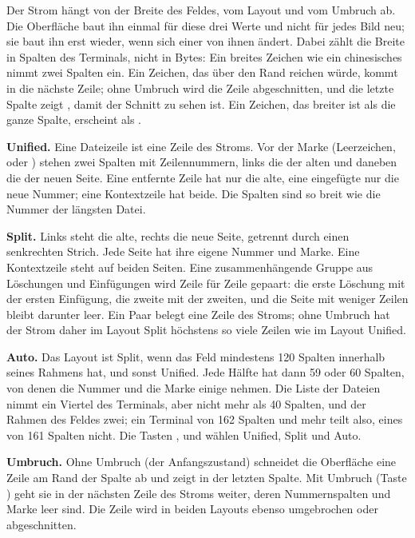 Der Strom hängt von der Breite des Feldes, vom Layout und vom Umbruch ab. Die Oberfläche baut
ihn einmal für diese drei Werte und nicht für jedes Bild neu; sie baut ihn erst wieder, wenn sich
einer von ihnen ändert. Dabei zählt die Breite in Spalten des Terminals, nicht in Bytes: Ein
breites Zeichen wie ein chinesisches nimmt zwei Spalten ein. Ein Zeichen, das über den Rand
reichen würde, kommt in die nächste Zeile; ohne Umbruch wird die Zeile abgeschnitten, und die
letzte Spalte zeigt , damit der Schnitt zu sehen ist. Ein Zeichen, das breiter ist als
die ganze Spalte, erscheint als .

\startitemize[n]
\item {\bf Unified.} Eine Dateizeile ist eine Zeile des Stroms. Vor der Marke (Leerzeichen,
\type{-} oder \type{+}) stehen zwei Spalten mit Zeilennummern, links die der alten und
daneben die der neuen Seite. Eine entfernte Zeile hat nur die alte, eine eingefügte nur die
neue Nummer; eine Kontextzeile hat beide. Die Spalten sind so breit wie die Nummer der
längsten Datei.
\item {\bf Split.} Links steht die alte, rechts die neue Seite, getrennt durch einen senkrechten
Strich. Jede Seite hat ihre eigene Nummer und Marke. Eine Kontextzeile steht auf beiden Seiten.
Eine zusammenhängende Gruppe aus Löschungen und Einfügungen wird Zeile für Zeile gepaart: die
erste Löschung mit der ersten Einfügung, die zweite mit der zweiten, und die Seite mit weniger
Zeilen bleibt darunter leer. Ein Paar belegt eine Zeile des Stroms; ohne Umbruch hat der Strom
daher im Layout Split höchstens so viele Zeilen wie im Layout Unified.
\item {\bf Auto.} Das Layout ist Split, wenn das Feld mindestens 120 Spalten innerhalb seines
Rahmens hat, und sonst Unified. Jede Hälfte hat dann 59 oder 60 Spalten, von denen die Nummer
und die Marke einige nehmen. Die Liste der Dateien nimmt ein Viertel des Terminals, aber nicht
mehr als 40 Spalten, und der Rahmen des Feldes zwei; ein Terminal von 162 Spalten und mehr
teilt also, eines von 161 Spalten nicht.
Die Tasten ,  und  wählen Unified, Split und Auto.
\item {\bf Umbruch.} Ohne Umbruch (der Anfangszustand) schneidet die Oberfläche eine Zeile am
Rand der Spalte ab und zeigt  in der letzten Spalte. Mit Umbruch (Taste ) geht
sie in der nächsten Zeile des Stroms weiter, deren Nummernspalten und Marke leer sind. Die Zeile
 wird in beiden Layouts ebenso umgebrochen oder abgeschnitten.
\stopitemize

